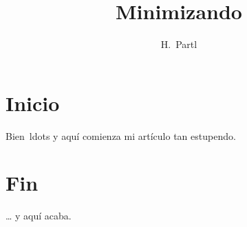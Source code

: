 \documentclass[a4paper,11pt]{article}
\author{H.~Partl}
\title{Minimizando}
\begin{document}
   \maketitle
   \tableofcontents
   \section{Inicio}
   Bien\ ldots{} y aqu\'i comienza mi art\'iculo tan estupendo.
   \section{Fin}
   \ldots{} y aqu\'i acaba.
\end{document}
